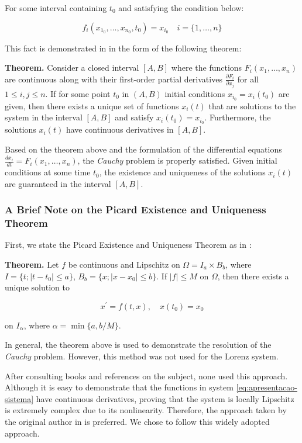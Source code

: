 \documentclass[12pt, a4paper]{article}
\begin{document}
For some interval containing $t_0$ and satisfying the condition below:

\begin{equation*}
	f_i(x_{1_0}, \ldots, x_{n_0}, t_0) = x_{i_0} \quad i = \{1, \ldots, n\}
\end{equation*}

This fact is demonstrated in \cite{ford1933} in the form of the following theorem:

\textbf{Theorem.} Consider a closed interval $[A, B]$ where the functions $F_i(x_1, \ldots, x_n)$ are continuous along with their first-order partial derivatives $\frac{\partial F_i}{\partial x_j}$ for all $1 \leq i,j \leq n$. If for some point $t_0$ in $(A, B)$ initial conditions $x_{i_0} = x_i(t_0)$ are given, then there exists a unique set of functions $x_i(t)$ that are solutions to the system in the interval $[A, B]$ and satisfy $x_i(t_0) = x_{i_0}$. Furthermore, the solutions $x_i(t)$ have continuous derivatives in $[A, B]$.

Based on the theorem above and the formulation of the differential equations $\frac{dx_i}{dt} = F_i(x_1, \ldots, x_n)$, the \textit{Cauchy} problem is properly satisfied. Given initial conditions at some time $t_0$, the existence and uniqueness of the solutions $x_i(t)$ are guaranteed in the interval $[A, B]$.

\subsubsection{A Brief Note on the Picard Existence and Uniqueness Theorem}

First, we state the Picard Existence and Uniqueness Theorem as in \cite{sotomayor1979}:

\textbf{Theorem.} Let $f$ be continuous and Lipschitz on $\Omega = I_a \times B_b$, where $I = \{t; \left|t - t_0 \right| \leq a\}$, $B_b = \{x; \left|x - x_0 \right| \leq b\}$. If $|f| \leq M$ on $\Omega$, then there exists a unique solution to

\begin{equation*}
	x^\prime = f(t, x), \quad x(t_0) = x_0
\end{equation*}

on $I_\alpha$, where $\alpha = \min \{a, b/M\}$.

In general, the theorem above is used to demonstrate the resolution of the \textit{Cauchy} problem. However, this method was not used for the Lorenz system.

After consulting books and references on the subject, none used this approach. Although it is easy to demonstrate that the functions in system \eqref{eq:apresentacao-sistema} have continuous derivatives, proving that the system is locally Lipschitz is extremely complex due to its nonlinearity. Therefore, the approach taken by the original author in \cite{Lorenz1963} is preferred. We chose to follow this widely adopted approach.
\end{document}
